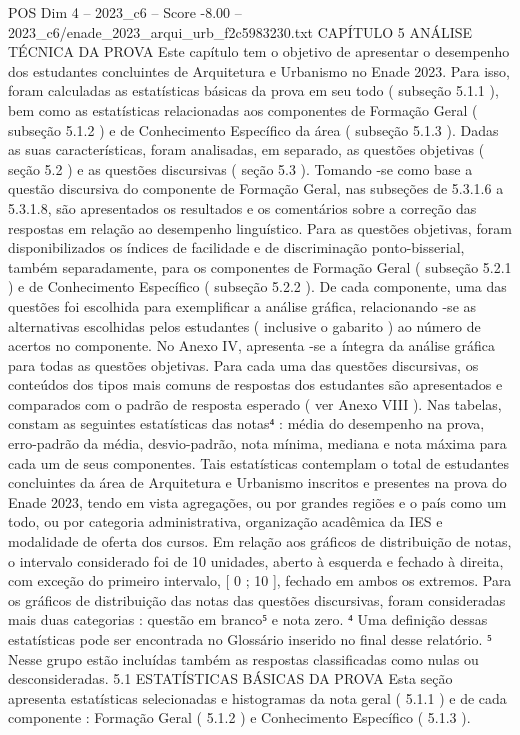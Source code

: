 \begin{textsample}{POS Dim 4 – 2023\_c6 – Score -8.00 – 2023\_c6/enade\_2023\_arqui\_urb\_f2c5983230.txt}  \label{ex:f4_pos_341}
CAPÍTULO 5 ANÁLISE TÉCNICA DA PROVA Este capítulo tem o objetivo de apresentar o desempenho dos estudantes concluintes de Arquitetura e Urbanismo no Enade 2023.
Para isso, foram calculadas as estatísticas básicas da prova em seu todo ( subseção 5.1.1 ), bem como as estatísticas relacionadas aos componentes de Formação Geral ( subseção 5.1.2 ) e de Conhecimento Específico da área ( subseção 5.1.3 ).
Dadas as suas características, foram analisadas, em separado, as questões objetivas ( seção 5.2 ) e as questões discursivas ( seção 5.3 ).
Tomando -se como base a questão discursiva do componente de Formação Geral, nas subseções de 5.3.1.6 a 5.3.1.8, são apresentados os resultados e os comentários sobre a correção das respostas em relação ao desempenho linguístico.
Para as questões objetivas, foram disponibilizados os índices de facilidade e de discriminação ponto-bisserial, também separadamente, para os componentes de Formação Geral ( subseção 5.2.1 ) e de Conhecimento Específico ( subseção 5.2.2 ).
De cada componente, uma das questões foi escolhida para exemplificar a análise gráfica, relacionando -se as alternativas escolhidas pelos estudantes ( inclusive o gabarito ) ao número de acertos no componente.
No Anexo IV, apresenta -se a íntegra da análise gráfica para todas as questões objetivas.
Para cada uma das questões discursivas, os conteúdos dos tipos mais comuns de respostas dos estudantes são apresentados e comparados com o padrão de resposta esperado ( ver Anexo VIII ).
Nas tabelas, constam as seguintes estatísticas das notas⁴ : média do desempenho na prova, erro-padrão da média, desvio-padrão, nota mínima, mediana e nota máxima para cada um de seus componentes.
Tais estatísticas contemplam o total de estudantes concluintes da área de Arquitetura e Urbanismo inscritos e presentes na prova do Enade 2023, tendo em vista agregações, ou por grandes regiões e o país como um todo, ou por categoria administrativa, organização acadêmica da IES e modalidade de oferta dos cursos.
Em relação aos gráficos de distribuição de notas, o intervalo considerado foi de 10 unidades, aberto à esquerda e fechado à direita, com exceção do primeiro intervalo, [ 0 ; 10 ], fechado em ambos os extremos.
Para os gráficos de distribuição das notas das questões discursivas, foram consideradas mais duas categorias : questão em branco⁵ e nota zero. ⁴ Uma definição dessas estatísticas pode ser encontrada no Glossário inserido no final desse relatório. ⁵ Nesse grupo estão incluídas também as respostas classificadas como nulas ou desconsideradas. 5.1 ESTATÍSTICAS BÁSICAS DA PROVA Esta seção apresenta estatísticas selecionadas e histogramas da nota geral ( 5.1.1 ) e de cada componente : Formação Geral ( 5.1.2 ) e Conhecimento Específico ( 5.1.3 ).

\end{textsample}
